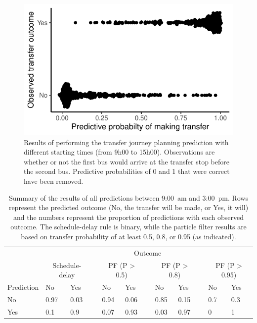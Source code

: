 \begin{knitrout}\small
{}\color{fgcolor}\begin{figure}

{\centering \includegraphics[width=.5\textwidth]{figure/eta_journey_transfer_many-1} 

}

\caption[Results of performing the transfer journey planning prediction with different starting times]{Results of performing the transfer journey planning prediction with different starting times (from  9h00 to 15h00). Observations are whether or not the first bus would arrive at the transfer stop before the second bus. Predictive probabilities of 0 and 1 that were correct have been removed.}\label{fig:eta_journey_transfer_many}
\end{figure}

\begin{table}

\caption[Summary of the results of all predictions between 9:00~am and 3:00~pm]{\label{tab:eta_journey_transfer_many}Summary of the results of all predictions between 9:00~am and 3:00~pm. Rows represent the predicted outcome (No, the transfer will be made, or Yes, it will) and the numbers represent the proportion of predictions with each observed outcome. The schedule-delay rule is binary, while the particle filter results are based on transfer probability of at least 0.5, 0.8, or 0.95 (as indicated).}
\centering
\fontsize{8}{10}\selectfont
\begin{tabular}[t]{llllllllllll}
\toprule
\multicolumn{1}{c}{} & \multicolumn{11}{c}{Outcome} \\
\cmidrule(l{3pt}r{3pt}){2-12}
\multicolumn{1}{c}{} & \multicolumn{2}{c}{Schedule-delay} & \multicolumn{1}{c}{} & \multicolumn{2}{c}{PF (P > 0.5)} & \multicolumn{1}{c}{} & \multicolumn{2}{c}{PF (P > 0.8)} & \multicolumn{1}{c}{} & \multicolumn{2}{c}{PF (P > 0.95)} \\
\cmidrule(l{3pt}r{3pt}){2-3} \cmidrule(l{3pt}r{3pt}){5-6} \cmidrule(l{3pt}r{3pt}){8-9} \cmidrule(l{3pt}r{3pt}){11-12}
Prediction & No & Yes &  & No & Yes &  & No & Yes &  & No & Yes\\
\midrule
No & 0.97 & 0.03 &  & 0.94 & 0.06 &  & 0.85 & 0.15 &  & 0.7 & 0.3\\
Yes & 0.1 & 0.9 &  & 0.07 & 0.93 &  & 0.03 & 0.97 &  & 0 & 1\\
\bottomrule
\end{tabular}
\end{table}


\end{knitrout}



